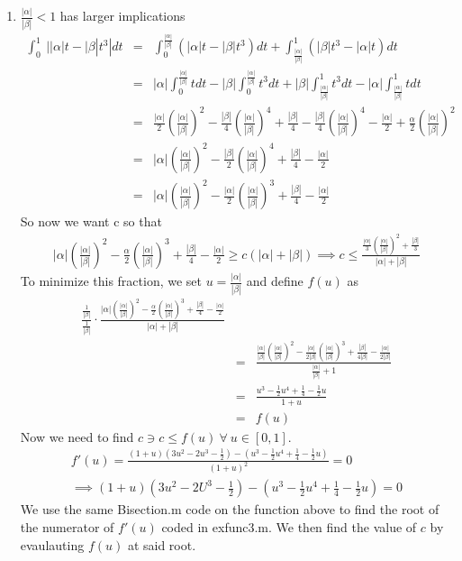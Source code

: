 \documentclass[11pt]{SelfArxOneColBMN}
\begin{document}
\begin{solution}
\begin{enumerate}
    \item $\frac{|\alpha|}{|\beta|} < 1$ has larger implications
    \begin{eqnarray*}
      \int_0^1 \:  ||\alpha| t - |\beta| t^3| dt 
      &=&
      \int_0^\frac{|\alpha|}{|\beta|} (|\alpha|t - |\beta|t^3) dt + \int_{\frac{|\alpha|}{|\beta|}}^1 (|\beta| t^3 - |\alpha|t) dt\\
      &=& |\alpha|\int_0^{\frac{|\alpha|}{|\beta|}}t dt - |\beta|\int_0^{\frac{|\alpha|}{|\beta|}}t^3 dt + |\beta|\int_{\frac{|\alpha|}{|\beta|}}^1 t^3 dt - |\alpha|\int_{\frac{|\alpha|}{|\beta|}}^1 t dt\\
      &=&\frac{|\alpha|}{2}(\frac{|\alpha|}{|\beta|})^2 - \frac{|\beta|}{4}(\frac{|\alpha|}{|\beta|})^4 + \frac{|\beta|}{4} - \frac{|\beta|}{4}(\frac{|\alpha|}{|\beta|})^4 - \frac{|\alpha|}{2} + \frac{\alpha}{2}(\frac{|\alpha|}{|\beta|})^2\\
      &=& |\alpha|(\frac{|\alpha|}{|\beta|})^2 - \frac{|\beta|}{2}(\frac{|\alpha|}{|\beta|})^4 + \frac{|\beta|}{4} - \frac{|\alpha|}{2}\\
      &=& |\alpha|(\frac{|\alpha|}{|\beta|})^2 - \frac{|\alpha|}{2}(\frac{|\alpha|}{|\beta|})^3 + \frac{|\beta|}{4} - \frac{|\alpha|}{2}
    \end{eqnarray*}
    So now we want c so that
    \begin{eqnarray*}
      |\alpha|(\frac{|\alpha|}{|\beta|})^2 - \frac{\alpha}{2}(\frac{|\alpha|}{|\beta|})^3 + \frac{|\beta|}{4} - \frac{|\alpha|}{2} \geq c(|\alpha| + |\beta|)
      \implies c \leq \frac{\frac{|\alpha|}{3}(\frac{|\alpha|}{|\beta|})^2 +\frac{|\beta|}{3}}{|\alpha| + |\beta|}
    \end{eqnarray*}
    To minimize this fraction, we set $u  = \frac{|\alpha|}{|\beta|}$ and define $f(u)$ as
    \begin{eqnarray*}
      \frac{\frac{1}{|\beta|}}{\frac{1}{|\beta|}} \cdot \frac{|\alpha|(\frac{|\alpha|}{|\beta|})^2 - \frac{\alpha}{2}(\frac{|\alpha|}{|\beta|})^3 + \frac{|\beta|}{4} - \frac{|\alpha|}{2}}{|\alpha| + |\beta|}\\
      &=& \frac{\frac{|\alpha|}{|\beta|}(\frac{|\alpha|}{|\beta|})^2 - \frac{|\alpha|}{2|\beta|}(\frac{|\alpha|}{|\beta|})^3 + \frac{|\beta|}{4|\beta|} - \frac{|\alpha|}{2|\beta|}}{\frac{|\alpha|}{|\beta|} + 1}\\
      &=& \frac{u^3 - \frac{1}{2}u^4 + \frac{1}{4} - \frac{1}{2}u}{1 + u}\\
      &=& f(u) 
    \end{eqnarray*}
    Now we need to find $c \ni c \leq f(u) \: \forall \: u \in [0,1]$. 
    \begin{eqnarray*}
      f'(u) = \frac{(1 + u)(3u^2 - 2u^3 - \frac{1}{2}) - (u^3 - \frac{1}{2}u^4 + \frac{1}{4} - \frac{1}{2}u)}{(1 + u)^2} = 0\\
      \implies (1 + u)(3u^2 - 2U^3 - \frac{1}{2}) - (u^3 - \frac{1}{2}u^4 + \frac{1}{4} - \frac{1}{2}u) = 0
    \end{eqnarray*}
    We use the same Bisection.m code on the function above to find the root of the numerator of $f'(u)$ coded in exfunc3.m. We then find the value of $c$ by evaulauting $f(u)$ at said root.


\end{enumerate}
\end{solution}
\end{document}
